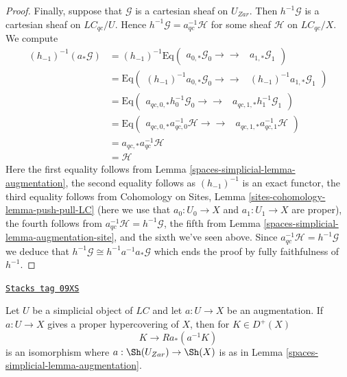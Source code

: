 \begin{proof}
\medskip\noindent
Finally, suppose that $\mathcal{G}$ is a cartesian sheaf on $U_{Zar}$.
Then $h^{-1}\mathcal{G}$ is a cartesian sheaf on $\textit{LC}_{qc}/U$.
Hence $h^{-1}\mathcal{G} = a_{qc}^{-1}\mathcal{H}$ for some sheaf
$\mathcal{H}$ on $\textit{LC}_{qc}/X$.
We compute
\begin{align*}
(h_{-1})^{-1}(a_*\mathcal{G})
& =
(h_{-1})^{-1}
\text{Eq}(
\begin{array}{cc}a_{0, *}\mathcal{G}_0
\longrightarrow\longrightarrow & a_{1, *}\mathcal{G}_1\end{array}
) \\
& =
\text{Eq}(
\begin{array}{cc}(h_{-1})^{-1}a_{0, *}\mathcal{G}_0
\longrightarrow\longrightarrow & (h_{-1})^{-1}a_{1, *}\mathcal{G}_1\end{array}
) \\
& =
\text{Eq}(
\begin{array}{cc}a_{qc, 0, *}h_0^{-1}\mathcal{G}_0
\longrightarrow\longrightarrow & a_{qc, 1, *}h_1^{-1}\mathcal{G}_1\end{array}
) \\
& =
\text{Eq}(
\begin{array}{cc}a_{qc, 0, *}a_{qc, 0}^{-1}\mathcal{H}
\longrightarrow\longrightarrow & a_{qc, 1, *}a_{qc, 1}^{-1}\mathcal{H}\end{array}
) \\
& =
a_{qc, *}a_{qc}^{-1}\mathcal{H} \\
& =
\mathcal{H}
\end{align*}
Here the first equality follows from Lemma \ref{spaces-simplicial-lemma-augmentation},
the second equality follows as $(h_{-1})^{-1}$ is an exact functor,
the third equality follows from
Cohomology on Sites, Lemma \ref{sites-cohomology-lemma-push-pull-LC}
(here we use that $a_0 : U_0 \to X$ and $a_1: U_1 \to X$ are proper),
the fourth follows from $a_{qc}^{-1}\mathcal{H} = h^{-1}\mathcal{G}$,
the fifth from Lemma \ref{spaces-simplicial-lemma-augmentation-site}, and the
sixth we've seen above. Since $a_{qc}^{-1}\mathcal{H} = h^{-1}\mathcal{G}$
we deduce that $h^{-1}\mathcal{G} \cong h^{-1}a^{-1}a_*\mathcal{G}$
which ends the proof by fully faithfulness of $h^{-1}$.
\end{proof}

\begin{lemma}
\label{spaces-simplicial-lemma-cohomological-descent-for-proper-hypercovering}
\href{https://stacks.math.columbia.edu/tag/09XS}{\texttt{Stacks tag 09XS}}

Let $U$ be a simplicial object of $\textit{LC}$ and let $a : U \to X$
be an augmentation. If $a : U \to X$ gives a proper hypercovering of $X$,
then for $K \in D^+(X)$
$$
K \to Ra_*(a^{-1}K)
$$
is an isomorphism where $a : \Sh(U_{Zar}) \to \Sh(X)$ is as in
Lemma \ref{spaces-simplicial-lemma-augmentation}.
\end{lemma}

